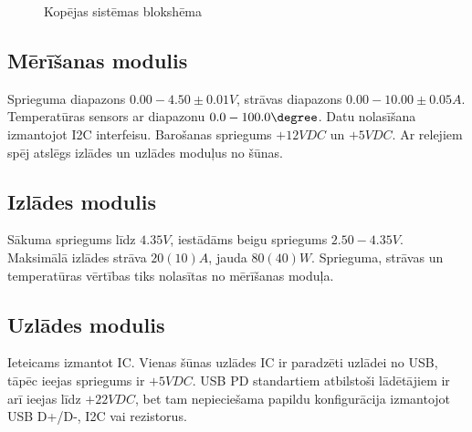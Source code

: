 \documentclass[12pt,fleqn,titlepage,oneside]{article}
\numberwithin{equation}{section}
\numberwithin{figure}{section}
\numberwithin{table}{section}
\begin{document}
\begin{figure}[h]
	\centering
	\caption{Kopējas sistēmas blokshēma}
\end{figure}

\subsection{Mērīšanas modulis}

Sprieguma diapazons $0.00-4.50\pm0.01 V$, strāvas diapazons $0.00-10.00\pm0.05 A$. Temperatūras sensors ar diapazonu $0.0-100.0\degree $. 
Datu nolasīšana izmantojot I2C interfeisu.
Barošanas spriegums $+12VDC$ un $+5VDC$. 
Ar relejiem spēj atslēgs izlādes un uzlādes moduļus no šūnas.

\subsection{Izlādes modulis}

Sākuma spriegums līdz $4.35V$, iestādāms beigu spriegums $2.50-4.35 V$.
Maksimālā izlādes strāva $20(10) A$, jauda $80(40) W$.
Sprieguma, strāvas un temperatūras vērtības tiks nolasītas no mērīšanas moduļa. 

\subsection{Uzlādes modulis}

Ieteicams izmantot IC. Vienas šūnas uzlādes IC ir paradzēti uzlādei no USB, tāpēc ieejas spriegums ir $+5VDC$. USB PD standartiem atbilstoši lādētājiem ir arī ieejas līdz $+22VDC$, bet tam nepieciešama papildu konfigurācija izmantojot USB D+/D-, I2C vai rezistorus.
\end{document}
